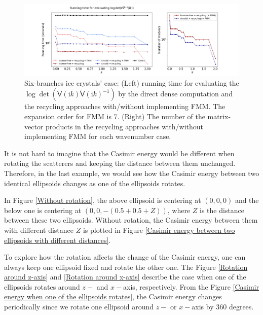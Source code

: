 \begin{figure}[H]
    \centering
    \hspace*{-1.5cm}\includegraphics[width = 1.2\textwidth]{figures/running_time_fmm.png}
    \caption{Six-branches ice crystals' case: (Left) running time for evaluating the $\log\det(\mathsf{V}(\mathrm{i}k)\tilde{\mathsf{V}}(\mathrm{i}k)^{-1})$ by
    the direct dense computation and the recycling approaches with/without implementing FMM. The expansion order for FMM is 7. 
    (Right) The number of the matrix-vector products in the recycling approaches with/without implementing FMM for each wavenumber case.}
    \label{running_time_fmm}
\end{figure}        
It is not hard to imagine that the Casimir energy would be different when rotating the scatterers and keeping the distance between them unchanged. Therefore, 
in the last example, we would see how the Casimir energy between two identical ellipsoids changes as one of the ellipsoids rotates.

In Figure \ref{Without rotation}, the above ellipsoid is centering at $(0,0,0)$ and the below one is centering at $(0, 0, -(0.5+0.5+Z))$, where $Z$ is the 
distance between these two ellipsoids. Without rotation, the Casimir energy between them with different distance $Z$ is plotted in Figure 
\ref{Casimir energy between two ellipsoids with different distances}.

To explore how the rotation affects the change of the Casimir energy, one can always keep one ellipsoid fixed and rotate the other one. The Figure 
\ref{Rotation around z-axis} and \ref{Rotation around x-axis} describe the case when one of the ellipsoids rotates around $z-$ and $x-$axis, respectively.
From the Figure \ref{Casimir energy when one of the ellipsoids rotates}, the Casimir energy changes periodically since we rotate one ellipsoid around 
$z-$ or $x-$axis by 360 degrees. 


